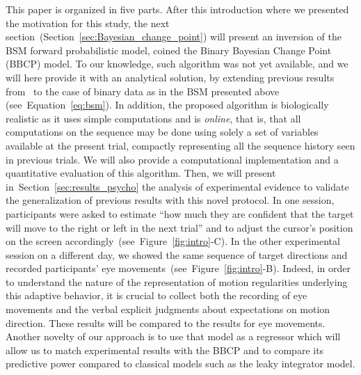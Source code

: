 \documentclass[12pt,english]{article}%
\newcommand{\citet}[1]{\textcite{#1}}
\newcommand{\seeFig}[1]{Figure~\ref{fig:#1}}
\newcommand{\seeEq}[1]{Equation~\ref{eq:#1}}
\newcommand{\seeSec}[1]{Section~\ref{sec:#1}}
\begin{document}
This paper is organized in five parts.
After this introduction where we presented the motivation for this study,
the next section~(\seeSec{Bayesian_change_point}) will present
an inversion of the BSM forward probabilistic model,
coined the Binary Bayesian Change Point (BBCP) model.
To our knowledge, such algorithm was not yet available, and
we will here provide it with an analytical solution,
by extending previous results from~\citet{AdamsMackay2007}
to the case of binary data as in the BSM presented above (see~\seeEq{bsm}).
In addition, the proposed algorithm is biologically realistic 
as it uses simple computations and is \emph{online},
that is, that all computations on the sequence may be done
using solely a set of variables available at the present trial,
compactly representing all the sequence history seen in previous trials.
We will also provide a computational implementation
and a quantitative evaluation of this algorithm.
Then, we will present in~\seeSec{results_psycho} the analysis of experimental evidence
to validate the generalization of previous results %
with this novel protocol. %
In one session, participants were asked to estimate
``how much they are confident that
the target will move to the right or left in the next trial'' and
to adjust the cursor's position on the screen accordingly~(see~\seeFig{intro}-C).
In the other experimental session on a different day, 
we showed the same sequence of target directions and 
recorded participants' eye movements~(see~\seeFig{intro}-B).
Indeed, in order to understand the nature of the representation of motion regularities underlying this adaptive behavior,
it is crucial to collect both 
the recording of eye movements
and the verbal explicit judgments about expectations on motion direction.
These results will be compared to the results for eye movements.
Another novelty of our approach is to use that model as a regressor
which will allow us to match experimental results with the BBCP
and to compare its predictive power compared to classical models such as the leaky integrator model.
\end{document}
